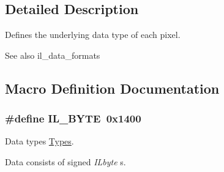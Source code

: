 \subsection{Detailed Description}
Defines the underlying data type of each pixel. 

\begin{DoxySeeAlso}{See also}
il\+\_\+data\+\_\+formats 
\end{DoxySeeAlso}


\subsection{Macro Definition Documentation}
\hypertarget{group__il__data__types_ga5a1e68002c5c3108e1fea27cb8b75330}{
\subsubsection[{I\+L\+\_\+\+B\+Y\+T\+E}]{\setlength{\rightskip}{0pt plus 5cm}\#define I\+L\+\_\+\+B\+Y\+T\+E~0x1400}}\label{group__il__data__types_ga5a1e68002c5c3108e1fea27cb8b75330}


Data types \hyperlink{}{Types}. 

Data consists of signed {\itshape I\+Lbyte} s. 